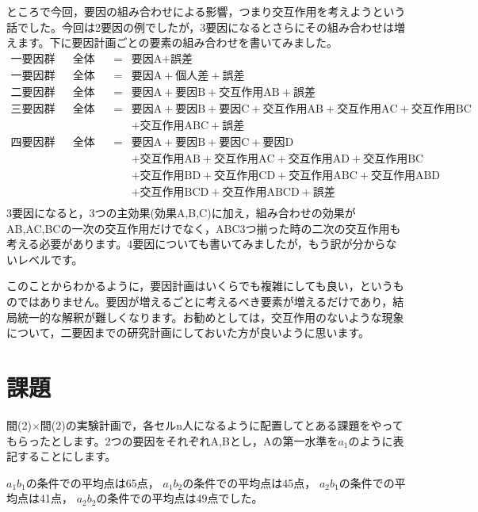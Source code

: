 \documentclass{ltjbook}
\begin{document}
ところで今回，要因の組み合わせによる影響，つまり交互作用を考えようという話でした。今回は2要因の例でしたが，3要因になるとさらにその組み合わせは増えます。下に要因計画ごとの要素の組み合わせを書いてみました。
\[
\begin{array}{llll}
\mbox{一要因群間計画} & \mbox{全体変動} &=& \mbox{要因A} + \mbox{誤差} \\
\mbox{一要因群内計画} & \mbox{全体変動} &=& \mbox{要因A} + \mbox{個人差} + \mbox{誤差}\\
 \mbox{二要因群間計画} & \mbox{全体変動} &=& \mbox{要因A} + \mbox{要因B} +\mbox{交互作用AB} +\mbox{誤差}\\
 \mbox{三要因群間計画} & \mbox{全体変動} &=& \mbox{要因A} + \mbox{要因B} + \mbox{要因C}+\mbox{交互作用AB} +\mbox{交互作用AC}+\mbox{交互作用BC} \\
 &&&+\mbox{交互作用ABC}  +\mbox{誤差}\\
 \mbox{四要因群間計画} & \mbox{全体変動} &=& \mbox{要因A} + \mbox{要因B} + \mbox{要因C} + \mbox{要因D}\\
 &&&  + \mbox{交互作用AB} +\mbox{交互作用AC} +\mbox{交互作用AD}+\mbox{交互作用BC}\\
 &&& +\mbox{交互作用BD} +\mbox{交互作用CD}+\mbox{交互作用ABC}+\mbox{交互作用ABD}\\
 &&& +\mbox{交互作用BCD} +\mbox{交互作用ABCD} +\mbox{誤差}\\
\end{array}
\]
3要因になると，3つの主効果(効果A,B,C)に加え，組み合わせの効果がAB,AC,BCの一次の交互作用だけでなく，ABC3つ揃った時の二次の交互作用も考える必要があります。4要因についても書いてみましたが，もう訳が分からないレベルです。

このことからわかるように，要因計画はいくらでも複雑にしても良い，というものではありません。要因が増えるごとに考えるべき要素が増えるだけであり，結局統一的な解釈が難しくなります。お勧めとしては，交互作用のないような現象について，二要因までの研究計画にしておいた方が良いように思います。

\section{課題}
間(2)$\times$間(2)の実験計画で，各セルn人になるように配置してとある課題をやってもらったとします。2つの要因をそれぞれA,Bとし，Aの第一水準を$a_1$のように表記することにします。

$a_1b_1$の条件での平均点は65点，
$a_1b_2$の条件での平均点は45点，
$a_2b_1$の条件での平均点は41点，
$a_2b_2$の条件での平均点は49点でした。
\end{document}

